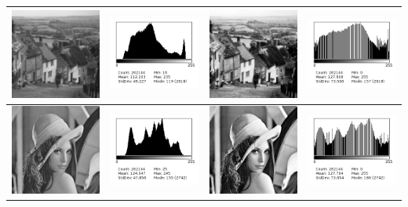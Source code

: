 \documentclass[a4paper,11pt]{article}
\begin{document}
\begin{tabular}{|c|c|c|c|}
   \hline
   \includegraphics[width=3cm]{goldhill.png} & \includegraphics[width=3cm]{../histo/image/hist_goldhill.png} & \includegraphics[width=3cm]{../res/goldhillQ3.png} & \includegraphics[width=3cm]{../histo/resultat/goldhillQ3.png}\\
   \hline
   \includegraphics[width=3cm]{lena512.png} & \includegraphics[width=3cm]{../histo/image/hist_lena512.png} & \includegraphics[width=3cm]{../res/lena512Q3.png} & \includegraphics[width=3cm]{../histo/resultat/lena512Q3.png}\\

\end{tabular}
\end{document}
